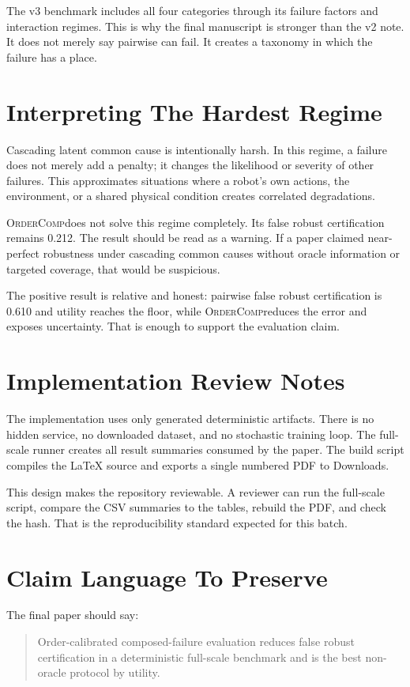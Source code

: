 \documentclass{article}
\newcommand{\method}{\textsc{OrderComp}}
\begin{document}
The v3 benchmark includes all four categories through its failure factors and interaction regimes. This is why the final manuscript is stronger than the v2 note. It does not merely say pairwise can fail. It creates a taxonomy in which the failure has a place.

\section{Interpreting The Hardest Regime}

Cascading latent common cause is intentionally harsh. In this regime, a failure does not merely add a penalty; it changes the likelihood or severity of other failures. This approximates situations where a robot's own actions, the environment, or a shared physical condition creates correlated degradations.

\method does not solve this regime completely. Its false robust certification remains 0.212. The result should be read as a warning. If a paper claimed near-perfect robustness under cascading common causes without oracle information or targeted coverage, that would be suspicious.

The positive result is relative and honest: pairwise false robust certification is 0.610 and utility reaches the floor, while \method reduces the error and exposes uncertainty. That is enough to support the evaluation claim.

\section{Implementation Review Notes}

The implementation uses only generated deterministic artifacts. There is no hidden service, no downloaded dataset, and no stochastic training loop. The full-scale runner creates all result summaries consumed by the paper. The build script compiles the LaTeX source and exports a single numbered PDF to Downloads.

This design makes the repository reviewable. A reviewer can run the full-scale script, compare the CSV summaries to the tables, rebuild the PDF, and check the hash. That is the reproducibility standard expected for this batch.

\section{Claim Language To Preserve}

The final paper should say:
\begin{quote}
Order-calibrated composed-failure evaluation reduces false robust certification in a deterministic full-scale benchmark and is the best non-oracle protocol by utility.
\end{quote}
\end{document}

